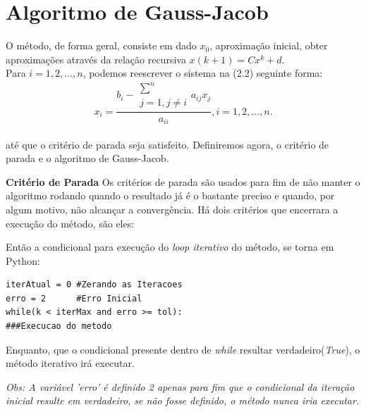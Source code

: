 \documentclass[
	12pt,				%
	openright,			%
	twoside,			%
	a4paper,			%
	english,			%
	french,				%
	spanish,			%
	brazil				%
	]{abntex2_new}
\begin{document}
\section{Algoritmo de Gauss-Jacob}
O método, de forma geral, consiste em dado $x_0$, aproximação inicial, 
obter aproximações através da relação recursiva $x{(k+1)}=Cx^k + d$.\\
Para $i = 1,2,...,n$, podemos reescrever o sistema na (2.2) seguinte forma:\\
$$x_i = \frac{b_i - \substack{\sum^{n} \\j=1,j \neq i}a_{ij}x_j}{a_{ii}}, i = 1,2,...,n.$$\\
até que o critério de parada seja satisfeito. Definiremos agora, o critério de parada e o 
algoritmo de Gauss-Jacob.

\begin{alineas}
	\item{\textbf{Critério de Parada}
	Os critérios de parada são usados para fim de não manter o algoritmo rodando quando o 
	resultado já é o bastante preciso e quando, por algum motivo, não alcançar a convergência.
	Há dois critérios que encerrara a execução do método, são eles:

Então a condicional para execução do \textit{loop iterativo} do método, se torna em Python:


\begin{lstlisting}
iterAtual = 0 #Zerando as Iteracoes
erro = 2      #Erro Inicial
while(k < iterMax and erro >= tol):
###Execucao do metodo
\end{lstlisting}

Enquanto, que o condicional presente dentro de \textit{while} resultar verdadeiro(\textit{True}), o método iterativo irá executar.

\textit{Obs: A variável 'erro' é definido 2 apenas para fim que o condicional da iteração inicial resulte em verdadeiro, se não fosse definido, o método nunca iria executar.}




}
\end{alineas}
\end{document}

